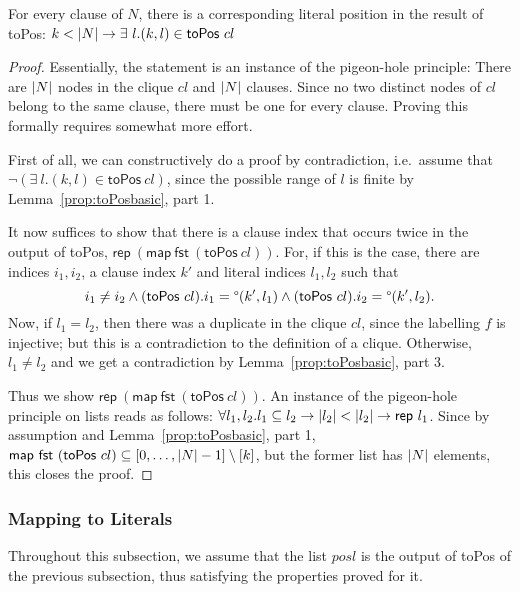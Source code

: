\documentclass[a4paper,UKenglish,cleveref, autoref]{lipics-v2019}
\begin{document}
\begin{lemma}
  For every clause of $N$, there is a corresponding literal position in the result of \normalfont\textsf{toPos}:
  $ k < |N| \rightarrow \exists~l. (k, l) \in \normalfont\textsf{toPos}~cl $
\end{lemma}
\begin{proof}
  Essentially, the statement is an instance of the pigeon-hole principle: There are $|N|$ nodes in the clique $cl$ and $|N|$ clauses. Since no two distinct nodes of $cl$ belong to the same clause, there must be one for every clause.
  Proving this formally requires somewhat more effort. 

  First of all, we can constructively do a proof by contradiction, i.e.\ assume that $\lnot(\exists~l. (k, l) \in \textsf{toPos}~cl)$, since the possible range of $l$ is finite by Lemma~\ref{prop:toPosbasic}, part 1.

  It now suffices to show that there is a clause index that occurs twice in the output of \textsf{toPos}, $\textsf{rep}~(\textsf{map}~\textsf{fst}~(\textsf{toPos}~cl))$. For, if this is the case, there are indices $i_1, i_2$, a clause index $k'$ and literal indices $l_1, l_2$ such that
  \[ i_1 \neq i_2 \land (\textsf{toPos}~cl).i_1 = \degree(k', l_1) \land (\textsf{toPos}~cl).i_2 = \degree(k', l_2). \]
  Now, if $l_1 = l_2$, then there was a duplicate in the clique $cl$, since the labelling $f$ is injective; but this is a contradiction to the definition of a clique. Otherwise, $l_1 \neq l_2$ and we get a contradiction by Lemma~\ref{prop:toPosbasic}, part 3. 

  Thus we show $\textsf{rep}~(\textsf{map}~\textsf{fst}~(\textsf{toPos}~cl))$. An instance of the pigeon-hole principle on lists reads as follows: 
  $\forall l_1, l_2. l_1 \subseteq l_2 \rightarrow |l_2| < |l_2| \rightarrow \textsf{rep}~l_1$.
  Since by assumption and Lemma~\ref{prop:toPosbasic}, part 1, $\textsf{map}~\textsf{fst}~(\textsf{toPos}~cl) \subseteq [0, \ldots, |N|-1] \setminus [k]$, but the former list has $|N|$ elements, this closes the proof.
\end{proof}

\subsubsection{Mapping to Literals}
Throughout this subsection, we assume that the list $posl$ is the output of \textsf{toPos} of the previous subsection, thus satisfying the properties proved for it.
\end{document}
